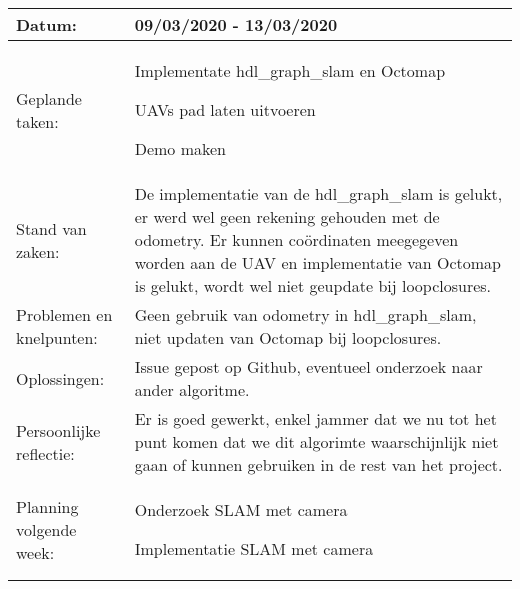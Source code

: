 \begin{tabularx}{\textwidth}{| l | X |}
  \hline
  Datum: & 09/03/2020 - 13/03/2020\\
  \hline
  Geplande taken: &
  \begin{compactitem}
    \item Implementate hdl\_graph\_slam en Octomap
    \item UAVs pad laten uitvoeren
    \item Demo maken
  \end{compactitem}\\
  \hline
  Stand van zaken: & De implementatie van de hdl\_graph\_slam is gelukt, er werd wel geen rekening gehouden met de odometry. Er kunnen co\"ordinaten meegegeven worden aan de UAV en implementatie van Octomap is gelukt, wordt wel niet geupdate bij loopclosures.\\
  \hline
  Problemen en knelpunten: & Geen gebruik van odometry in hdl\_graph\_slam, niet updaten van Octomap bij loopclosures.\\
  \hline
  Oplossingen: & Issue gepost op Github, eventueel onderzoek naar ander algoritme.\\
  \hline
  Persoonlijke reflectie: & Er is goed gewerkt, enkel jammer dat we nu tot het punt komen dat we dit algorimte waarschijnlijk niet gaan of kunnen gebruiken in de rest van het project.\\
  \hline
  Planning volgende week: &
  \begin{compactitem}
    \item Onderzoek SLAM met camera
    \item Implementatie SLAM met camera
  \end{compactitem}\\
  \hline
\end{tabularx}